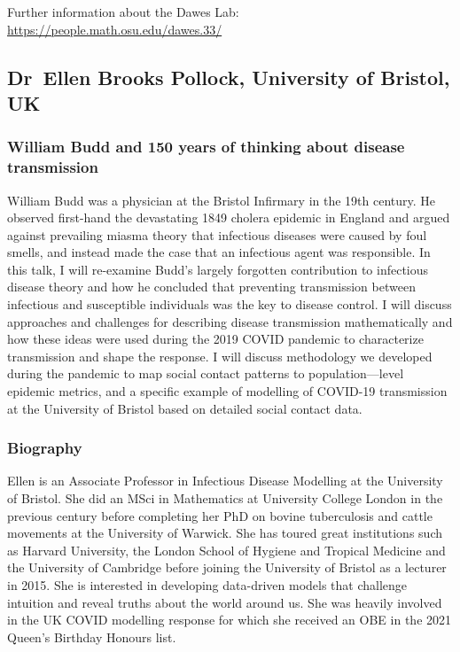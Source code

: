 \documentclass[12pt,a4paper]{article}
\begin{document}
Further information about the Dawes Lab: \href{https://people.math.osu.edu/dawes.33/}{https://people.math.osu.edu/dawes.33/}

\subsection{Dr~Ellen Brooks Pollock, University of Bristol, UK}

\subsubsection{William Budd and 150 years of thinking about disease transmission}

William Budd was a physician at the Bristol Infirmary in the 19th century. He observed first-hand the devastating 1849 cholera epidemic in England and argued against prevailing miasma theory that infectious diseases were caused by foul smells, and instead made the case that an infectious agent was responsible. In this talk, I will re-examine Budd’s largely forgotten contribution to infectious disease theory and how he concluded that preventing transmission between infectious and susceptible individuals was the key to disease control. I will discuss approaches and challenges for describing disease transmission mathematically and how these ideas were used during the 2019 COVID pandemic to characterize transmission and shape the response. I will discuss methodology we developed during the pandemic to map social contact patterns to population—level epidemic metrics, and a specific example of modelling of COVID-19 transmission at the University of Bristol based on detailed social contact data.   
\subsubsection{Biography}

Ellen is an Associate Professor in Infectious Disease Modelling at the University of Bristol. She did an MSci in Mathematics at University College London in the previous century before completing her PhD on bovine tuberculosis and cattle movements at the University of Warwick. She has toured great institutions such as Harvard University, the London School of Hygiene and Tropical Medicine and the University of Cambridge before joining the University of Bristol as a lecturer in 2015. She is interested in developing data-driven models that challenge intuition and reveal truths about the world around us. She was heavily involved in the UK COVID modelling response for which she received an OBE in the 2021 Queen’s Birthday Honours list.  
\end{document}
